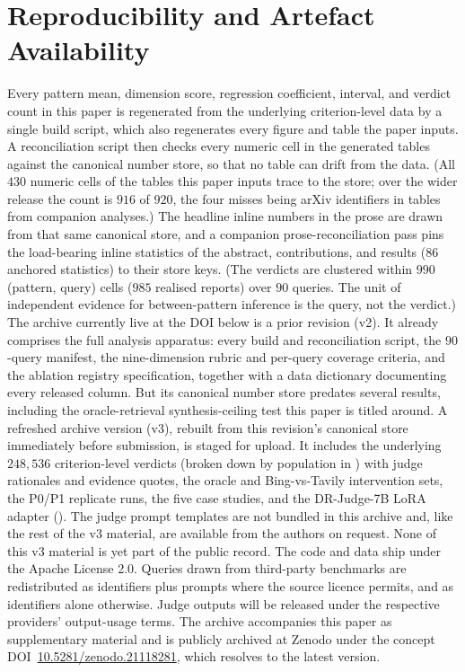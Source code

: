\documentclass[11pt]{article}
\begin{document}
\section*{Reproducibility and Artefact Availability}\label{sec:repro}
Every pattern mean, dimension score, regression coefficient, interval, and verdict count in
this paper is regenerated from the underlying criterion-level data by a single build
script, which also regenerates every figure and table the
paper inputs. A reconciliation script then checks every numeric cell in the generated tables
against the canonical number store, so that no table can drift from the data. (All $430$
numeric cells of the tables this paper inputs trace to the store; over the wider release
the count is $916$ of $920$, the four misses being arXiv identifiers in tables from
companion analyses.) The headline inline numbers in the prose are drawn from that same
canonical store, and a companion prose-reconciliation pass pins the load-bearing inline
statistics of the abstract, contributions, and results ($86$ anchored statistics) to their
store keys. (The verdicts are clustered within
$990$ (pattern, query) cells ($985$ realised reports) over $90$ queries. The unit of
independent evidence for between-pattern inference is the query, not the
verdict.) The archive currently live at the DOI below is a prior
revision (v2). It already comprises the full analysis apparatus: every build and
reconciliation script, the $90$-query manifest, the nine-dimension rubric and per-query coverage
criteria, and the ablation registry specification, together with a data dictionary documenting every
released column. But its canonical number store predates several results, including the
oracle-retrieval synthesis-ceiling test this paper is titled around. A refreshed archive version (v3),
rebuilt from this revision's canonical store immediately before submission, is staged for upload. It includes the
underlying $248{,}536$ criterion-level verdicts (broken down by population in ) with judge rationales and evidence quotes, the oracle
and Bing-vs-Tavily intervention sets, the P0/P1 replicate runs, the five case
studies, and the DR-Judge-7B LoRA adapter (). The judge prompt templates are not
bundled in this archive and, like the rest of the v3 material, are available from the
authors on request. None of this v3 material is yet part
of the public record. The code and data ship under the Apache License 2.0. Queries drawn from
third-party benchmarks are redistributed as identifiers plus prompts where the source licence
permits, and as identifiers alone otherwise. Judge outputs will be released under the
respective providers' output-usage terms. The archive accompanies this paper as supplementary
material and is publicly archived at Zenodo under the concept DOI~\href{https://doi.org/10.5281/zenodo.21118281}{10.5281/zenodo.21118281}, which resolves to the latest version.
\end{document}
